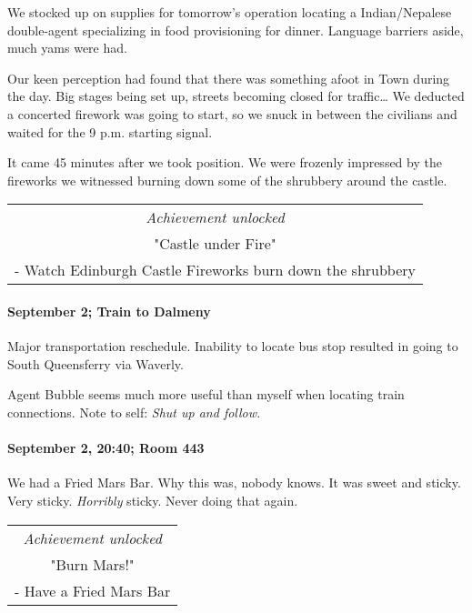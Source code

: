 We stocked up on supplies for tomorrow's operation locating a Indian/Nepalese double-agent specializing in food provisioning for dinner.
Language barriers aside, much yams were had.

Our keen perception had found that there was something afoot in Town during the day.
Big stages being set up, streets becoming closed for traffic\ldots
We deducted a concerted firework was going to start, so we snuck in between the civilians and waited for the 9 p.m. starting signal.

It came 45 minutes after we took position.
We were frozenly impressed by the fireworks we witnessed burning down some of the shrubbery around the castle.

\begin{center}
\begin{tabular}{||c||}
\emph{Achievement unlocked}\\
"Castle under Fire"\\
\multicolumn{1}{||p{0.8\textwidth}||}{\footnotesize - Watch Edinburgh Castle Fireworks burn down the shrubbery} \\
\end{tabular}
\end{center}

\paragraph{September 2; Train to Dalmeny}
Major transportation reschedule.
Inability to locate bus stop resulted in going to South Queensferry via Waverly.

Agent Bubble seems much more useful than myself when locating train connections.
Note to self: \emph{Shut up and follow.}

\paragraph{September 2, 20:40; Room 443}
We had a Fried Mars Bar.
Why this was, nobody knows.
It was sweet and sticky.
Very sticky.
\emph{Horribly} sticky.
Never doing that again.

\begin{center}
\begin{tabular}{||c||}
\emph{Achievement unlocked}\\
"Burn Mars!"\\
\multicolumn{1}{||p{0.8\textwidth}||}{\footnotesize - Have a Fried Mars Bar} \\
\end{tabular}
\end{center}

